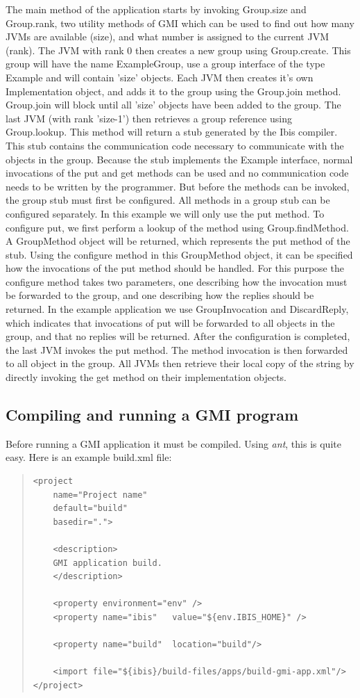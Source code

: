 \documentclass[10pt]{article}
\newcommand{\mysubsection}[1]{\subsection{#1}\label{#1}}
\begin{document}
The main method of the application starts by invoking Group.size and
Group.rank, two utility methods of GMI which can be used to find out
how many JVMs are available (size), and what number is assigned to the
current JVM (rank).  The JVM with rank 0 then creates a new group
using Group.create. This group will have the name ExampleGroup, use a
group interface of the type Example and will contain 'size'
objects. Each JVM then creates it's own Implementation object, and
adds it to the group using the Group.join method. Group.join will
block until all 'size' objects have been added to the group.  The last
JVM (with rank 'size-1') then retrieves a group reference using
Group.lookup. This method will return a stub generated by the Ibis
compiler. This stub contains the communication code necessary to
communicate with the objects in the group. Because the stub implements
the Example interface, normal invocations of the put and get methods
can be used and no communication code needs to be written by the
programmer. But before the methods can be invoked, the group stub must
first be configured.  All methods in a group stub can be configured
separately. In this example we will only use the put method. To
configure put, we first perform a lookup of the method using
Group.findMethod. A GroupMethod object will be returned, which
represents the put method of the stub.  Using the configure method in
this GroupMethod object, it can be specified how the invocations of
the put method should be handled. For this purpose the configure
method takes two parameters, one describing how the invocation must be
forwarded to the group, and one describing how the replies should be
returned. In the example application we use GroupInvocation and
DiscardReply, which indicates that invocations of put will be
forwarded to all objects in the group, and that no replies will be
returned.  After the configuration is completed, the last JVM invokes
the put method. The method invocation is then forwarded to all object
in the group. All JVMs then retrieve their local copy of the string by
directly invoking the get method on their implementation objects.


\mysubsection{Compiling and running a GMI program}

Before running a GMI application it must be compiled.
Using \emph{ant}, this is quite easy. Here is an example build.xml file:

\begin{quote}
\begin{verbatim}
<project
    name="Project name"
    default="build"
    basedir=".">

    <description>
    GMI application build.
    </description>

    <property environment="env" />
    <property name="ibis"   value="${env.IBIS_HOME}" />

    <property name="build"  location="build"/>

    <import file="${ibis}/build-files/apps/build-gmi-app.xml"/>
</project>
\end{verbatim}
\end{quote}
\end{document}
